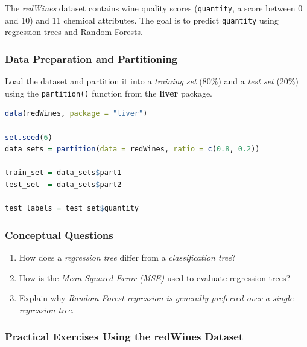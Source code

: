 \documentclass[
  11pt,
]{book}
\newcommand{\passthrough}[1]{#1}
\providecommand{\tightlist}{%
  \setlength{\itemsep}{0pt}\setlength{\parskip}{0pt}}
\theoremstyle{definition}
\theoremstyle{definition}
\theoremstyle{definition}
\theoremstyle{definition}
\theoremstyle{remark}
\begin{document}
The \emph{redWines} dataset contains wine quality scores (\passthrough{\lstinline!quantity!}, a score between 0 and 10) and 11 chemical attributes. The goal is to predict \passthrough{\lstinline!quantity!} using regression trees and Random Forests.

\subsubsection*{Data Preparation and Partitioning}\label{data-preparation-and-partitioning-1}


Load the dataset and partition it into a \emph{training set} (80\%) and a \emph{test set} (20\%) using the \passthrough{\lstinline!partition()!} function from the \textbf{liver} package.

\begin{lstlisting}[language=R]
data(redWines, package = "liver")

set.seed(6)
data_sets = partition(data = redWines, ratio = c(0.8, 0.2))

train_set = data_sets$part1
test_set  = data_sets$part2

test_labels = test_set$quantity
\end{lstlisting}

\subsubsection*{Conceptual Questions}\label{conceptual-questions-9}


\begin{enumerate}
\def\labelenumi{\arabic{enumi}.}
\setcounter{enumi}{37}
\tightlist
\item
  How does a \emph{regression tree} differ from a \emph{classification tree}?\\
\item
  How is the \emph{Mean Squared Error (MSE)} used to evaluate regression trees?\\
\item
  Explain why \emph{Random Forest regression is generally preferred over a single regression tree}.
\end{enumerate}

\subsubsection*{Practical Exercises Using the redWines Dataset}\label{practical-exercises-using-the-redwines-dataset}
\end{document}
